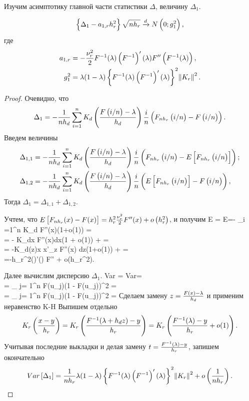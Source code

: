 \documentclass[a4paper,14pt,russian]{article}
\begin{document}
Изучим асимптотику главной части статистики $\Delta$, величину $\Delta_{1}$.
\begin{lemma}
  $$
  \left\{\Delta_{1} -a_{1,r} h_r^2\right\}\sqrt{n h_r} \xrightarrow{d} N\left(0;g_1^2\right),
  $$
  где
\begin{align*}
   a_{1,r} &= -\frac{\nu_r^2}{2}F^{-1}(\lambda)\left(F^{-1}\right)'(\lambda) F''\left(F^{-1}(\lambda)\right),\\
 g_1^2 &= \lambda (1- \lambda) \left\{F^{-1}(\lambda)\left(F^{-1}\right)'(\lambda)\right\}^2\norm{K_r}^2.
\end{align*}
\end{lemma}
\begin{proof}
Очевидно, что
$$
\Delta_{1} = - \frac{1}{n h_d} \sum_{i =1}^n K_d\left(\frac{F\left(i/n\right)-\lambda}{h_d}\right)\frac{i}{n }\left(F_{n h_r}\left(i/n\right)- F\left(i/n\right)\right).
$$
Введем величины
\begin{align*}
  \Delta_{1,1} &= - \frac{1}{n h_d} \sum_{i =1}^n K_d\left(\frac{F\left(i/n\right)-\lambda}{h_d}\right)\frac{i}{n }\left(F_{n h_r}\left(i/n\right)- E\left[F_{n h_r}\left(i/n\right)\right]\right);\\
  \Delta_{1,2} &= - \frac{1}{n h_d} \sum_{i =1}^n K_d\left(\frac{F\left(i/n\right)-\lambda}{h_d}\right)\frac{i}{n }\left(E\left[F_{n h_r}\left(i/n\right)\right]- F\left(i/n\right)\right),
\end{align*}
Тогда $\Delta_{1} =\Delta_{1,1} + \Delta_{1,2}$.

Учтем, что $E\left[F_{n h_r}(x)-F(x)\right] = h_r^2 \frac{\nu_r^2}{2} F''(x)+ o\left(h_r^2\right)$, и получим
\ml
{
E = E=- \sum_{i =1}^n K_d  F''(x)(1+o(1)) = \\= -   K_dx F''(x)dx(1 + o(1)) +  =\\= -K_d(z)x x'_z  F''(x) dz(1+o(1)) +   = \\=-h_r^2\F(\la)\F'(\la) F''\brr{\F(\la)} + o(h_r^2).
}

Далее вычислим дисперсию $\Delta_{1}$.
\ml
{
Var = Var=\\= \sum_ {j= 1}^n F(u_j)(1 - F(u_j))^2 = \\= \sum_ {j= 1}^n F(u_j)(1 - F(u_j))^2 = }
Сделаем замену  $z = \frac{F(x)-\lambda}{h_d}$  и применим неравенство K-H
Выпишем отдельно
$$
K_r\left(\frac{x-y}{h_r}\right) = K_r\left(\frac{F^{-1}(\lambda + h_d z)-y}{h_r}\right) = K_r\left(\frac{F^{-1}(\lambda)-y}{h_r} + o(1)\right).
$$
Учитывая последние выкладки и делая замену $t = \frac{F^{-1}(\lambda)-y}{h_r}$, запишем окончательно
$$
Var\left[\Delta_{1}\right] = \frac{1}{n h_r} \lambda (1- \lambda) \left\{F^{-1}(\lambda)\left(F^{-1}\right)'(\lambda)\right\}^2\norm{K_r}^2 + o\left(\frac{1}{n h_r}\right).
$$

\end{proof}
\end{document}
